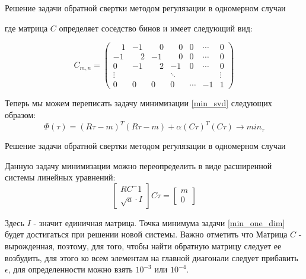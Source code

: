 \documentclass[fullscreen=true,russian,compress,%
	hyperref={unicode,bookmarks=false}]{presentation}
\begin{document}
\begin{frame}{Решение задачи обратной свертки методом регулязации в одномерном случаи}

   где матрица $C$ определяет соседство бинов и имеет следующий вид:

   \begin{equation}
       C_{m,n} = 
    \begin{pmatrix}
      \quad 1 &       -1 &  \quad 0 &  \quad 0 & 0 & \cdots & 0 \\
           -1 &  \quad 2 &       -1 &  \quad 0 & 0 & \cdots & 0 \\
            0 &       -1 & \quad  2 &       -1 & 0 & \cdots & 0 \\
     \vdots &  & & \ddots & & & \vdots \\
     0  & 0  & 0 & 0 & \cdots & -1 & 1
    \end{pmatrix}
    \label{one_dim_neighbors_mat}
   \end{equation}

   Теперь мы можем переписать задачу минимизации \eqref{min_svd} следующих образом:
   \begin{equation}
      \Phi(\tau)=(R\tau-m)^T (R\tau-m) + \alpha(C\tau)^T(C\tau) \to min_{\tau}
      \label{min_one_dim}
   \end{equation}
\end{frame}


\begin{frame}{Решение задачи обратной свертки методом регулязации в одномерном случаи}

Данную задачу минимизации можно переопределить в виде расширенной системы линейных уравнений:
\begin{equation}
    \begin{bmatrix}
        RC^-1 \\
        \sqrt{a} \cdot I
    \end{bmatrix}
    C\tau = 
    \begin{bmatrix}
        m \\
        0
    \end{bmatrix}
    \label{system_one_dim}
\end{equation}

Здесь $I$ - значит единичная матрица. 
Точка минимума задачи \eqref{min_one_dim} будет достигаться при решении новой системы. Важно отметить что Матрица
$C$ - вырожденная, поэтому, для того, чтобы найти обратную матрицу следует ее возбудить, для этого ко всем элементам
на главной диагонали следует прибавить $\epsilon$, для определенности можно взять $10^{-3}$ или $10^{-4}$.

\end{frame}
\end{document}
